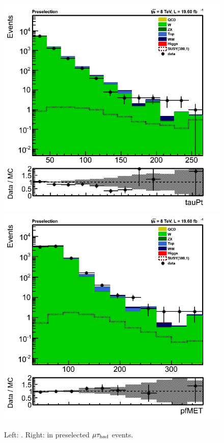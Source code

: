 \begin{figure}[!Hhtb]
\centering
\includegraphics[angle=0,scale=0.35]{SelectionMuTau/tauPt_muTau.png}
\includegraphics[angle=0,scale=0.35]{SelectionMuTau/pfMET_muTau.png}
\caption{Left: \Tau\PT. Right: \MET in preselected $\mu\tau_{\rm had}$ events.}
\label{fig:datamcmuotau}
\end{figure}

